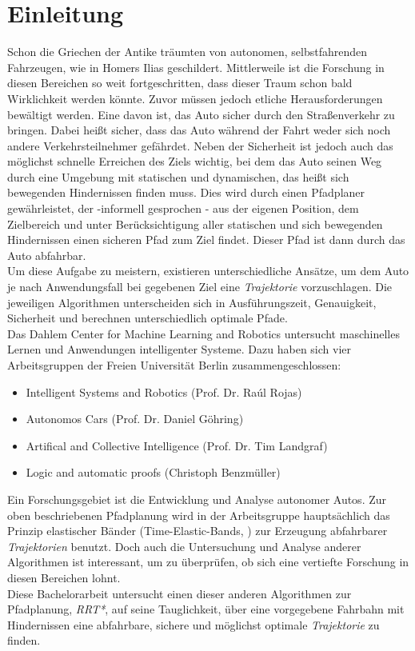 \section{Einleitung}
Schon die Griechen der Antike träumten von autonomen, selbstfahrenden Fahrzeugen, wie in Homers Ilias geschildert. Mittlerweile ist die Forschung in diesen Bereichen so weit fortgeschritten, dass dieser Traum schon bald Wirklichkeit werden könnte. Zuvor müssen jedoch etliche Herausforderungen bewältigt werden. Eine davon ist, das Auto sicher durch den Straßenverkehr zu bringen. Dabei heißt sicher, dass das Auto während der Fahrt weder sich noch andere Verkehrsteilnehmer gefährdet. Neben der Sicherheit ist jedoch auch das möglichst schnelle Erreichen des Ziels wichtig, bei dem das Auto seinen Weg durch eine Umgebung mit statischen und dynamischen, das heißt sich bewegenden Hindernissen finden muss. Dies wird durch einen Pfadplaner gewährleistet, der -informell gesprochen - aus der eigenen Position, dem Zielbereich und unter Berücksichtigung aller statischen und sich bewegenden Hindernissen einen sicheren Pfad zum Ziel findet. Dieser Pfad ist dann durch das Auto abfahrbar.\\
Um diese Aufgabe zu meistern, existieren unterschiedliche Ansätze, um dem Auto je nach Anwendungsfall bei gegebenen Ziel eine \textit{Trajektorie} vorzuschlagen. Die jeweiligen Algorithmen unterscheiden sich in Ausführungszeit, Genauigkeit, Sicherheit und berechnen unterschiedlich optimale Pfade.  \\
Das Dahlem Center for Machine Learning and Robotics untersucht maschinelles Lernen und Anwendungen intelligenter Systeme. Dazu haben sich vier Arbeitsgruppen der Freien Universität Berlin zusammengeschlossen:
\begin{itemize}
\item Intelligent Systems and Robotics (Prof. Dr. Raúl Rojas)
\item Autonomos Cars (Prof. Dr. Daniel Göhring)
\item Artifical and Collective Intelligence (Prof. Dr. Tim Landgraf)
\item Logic and automatic proofs (Christoph Benzmüller)
\end{itemize}
Ein Forschungsgebiet ist die Entwicklung und Analyse autonomer Autos. Zur oben beschriebenen Pfadplanung wird in der Arbeitsgruppe hauptsächlich das Prinzip elastischer Bänder (Time-Elastic-Bands, \citep[vgl.][]{RoeHoBe}) zur Erzeugung abfahrbarer \textit{Trajektorien} benutzt. Doch auch die Untersuchung und Analyse anderer Algorithmen ist interessant, um zu überprüfen, ob sich eine vertiefte Forschung in diesen Bereichen lohnt. \\ 
Diese Bachelorarbeit untersucht einen dieser anderen Algorithmen zur Pfadplanung, \textit{RRT*}, auf seine Tauglichkeit, über eine vorgegebene Fahrbahn mit Hindernissen eine abfahrbare, sichere und möglichst optimale \textit{Trajektorie} zu finden. 

